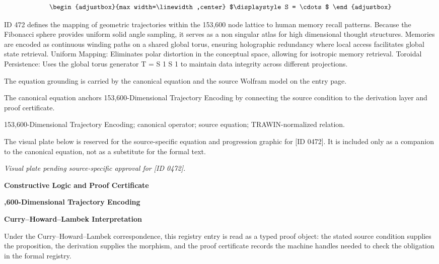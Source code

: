 \[
\begin{adjustbox}{max width=\linewidth,center}
$\displaystyle
S = \cdots
$
\end{adjustbox}
\]

ID 472 defines the mapping of geometric trajectories within the 153,600 node lattice to human memory recall patterns. Because the Fibonacci sphere provides uniform solid angle sampling, it serves as a non singular atlas for high dimensional thought structures. Memories are encoded as continuous winding paths on a shared global torus, ensuring holographic redundancy where local access facilitates global state retrieval. Uniform Mapping: Eliminates polar distortion in the conceptual space, allowing for isotropic memory retrieval. Toroidal Persistence: Uses the global torus generator T = S 1 S 1 to maintain data integrity across different projections.

The equation grounding is carried by the canonical equation and the source Wolfram model on the entry page.

The canonical equation anchors 153,600-Dimensional Trajectory Encoding by connecting the source condition to the derivation layer and proof certificate.

153,600-Dimensional Trajectory Encoding; canonical operator; source equation; TRAWIN-normalized relation.
\endgroup

\begingroup\footnotesize\sloppy
The visual plate below is reserved for the source-specific equation and progression graphic for [ID 0472]. It is included only as a companion to the canonical equation, not as a substitute for the formal text.
\par\endgroup
\begingroup\footnotesize\itshape
Visual plate pending source-specific approval for [ID 0472].
\par\endgroup

\clearpage
\begingroup\tzpsupportsetup
\noindent\textbf{\fontsize{10.8pt}{12.8pt}\selectfont [ID 0472] Constructive Logic and Proof Certificate}\par
\noindent\textbf{\fontsize{10pt}{12pt},600-Dimensional Trajectory Encoding}\par
\vspace{0.45em}
\begingroup
\footnotesize
\setlength{\parskip}{0.22em}
\setlength{\parindent}{0pt}
\noindent\textbf{Curry--Howard--Lambek Interpretation}\par
Under the Curry--Howard--Lambek correspondence, this registry entry is read as a typed proof
object: the stated source condition supplies the proposition, the derivation supplies the
morphism, and the proof certificate records the machine handles needed to check the obligation
in the formal registry.

